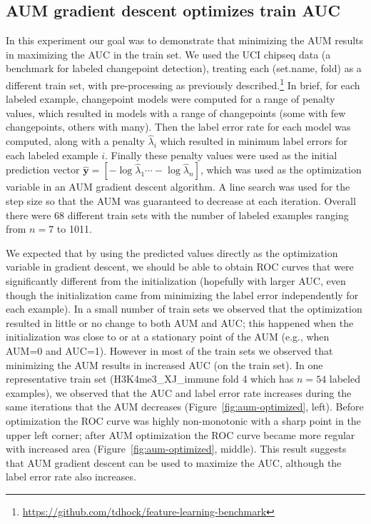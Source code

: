 \documentclass{article}
\begin{document}
\subsection{AUM gradient descent optimizes train AUC}

In this experiment our goal was to demonstrate that minimizing the AUM results in maximizing the AUC in the train set. 
We used the UCI chipseq data (a benchmark for labeled changepoint detection), treating each (set.name, fold) as a different train set, with pre-processing as previously described.\footnote{
\url{https://github.com/tdhock/feature-learning-benchmark}}
In brief, for each labeled example, changepoint models were computed for a range of penalty values, which resulted in models with a range of changepoints (some with few changepoints, others with many).
Then the label error rate for each model was computed, along with a penalty $\hat \lambda_i$ which resulted in minimum label errors for each labeled example $i$.
Finally these penalty values were used as the initial prediction vector $\mathbf{\hat y} = [ -\log\hat\lambda_1 \cdots -\log\hat\lambda_n]$, which was used as the optimization variable in an AUM gradient descent algorithm. 
A line search was used for the step size so that the AUM was guaranteed to decrease at each iteration. 
Overall there were 68 different train sets with the number of labeled examples ranging from $n=7$ to 1011.

We expected that by using the predicted values directly as the optimization variable in gradient descent, we should be able to obtain ROC curves that were significantly different from the initialization (hopefully with larger AUC, even though the initialization came from minimizing the label error independently for each example).
In a small number of train sets we observed that the optimization resulted in little or no change to both AUM and AUC; this happened when the initialization was close to or at a stationary point of the AUM (e.g., when AUM=0 and AUC=1).
However in most of the train sets we observed that minimizing the AUM results in increased AUC (on the train set). 
In one representative train set (H3K4me3\_XJ\_immune fold 4 which has $n=54$ labeled examples), we observed that the AUC and label error rate increases during the same iterations that the AUM decreases (Figure~\ref{fig:aum-optimized}, left).
Before optimization the ROC curve was highly non-monotonic with a sharp point in the upper left corner; after AUM optimization the ROC curve became more regular with increased area (Figure~\ref{fig:aum-optimized}, middle).
This result suggests that AUM gradient descent can be used to maximize the AUC, although the label error rate also increases.
\end{document}

